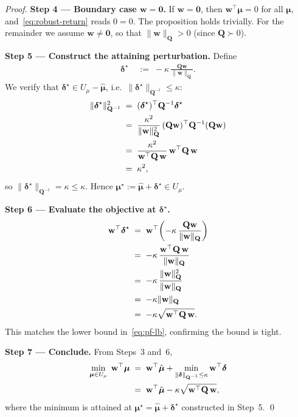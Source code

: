 \documentclass[12pt,openany]{book}
\newcommand{\bfw}{\mathbf{w}}
\newcommand{\bfmu}{\boldsymbol{\mu}}
\newcommand{\bfQ}{\mathbf{Q}}
\newcommand{\bfdelta}{\boldsymbol{\delta}}
\newcommand{\calU}{\mathcal{U}}
\numberwithin{equation}{chapter}
\theoremstyle{plain}
\theoremstyle{definition}
\theoremstyle{remark}
\numberwithin{equation}{chapter}
\theoremstyle{plain}
\def\calU{U}%
\begin{document}
\begin{proof}
\medskip
\noindent\textbf{Step 4 — Boundary case $\bfw = \mathbf{0}$.}
If $\bfw = \mathbf{0}$, then $\bfw^\top\bfmu = 0$ for all $\bfmu$,
and~\eqref{eq:robust-return} reads $0 = 0$.  The proposition holds
trivially.  For the remainder we assume $\bfw \neq \mathbf{0}$,
so that $\|\bfw\|_{\bfQ} > 0$ (since $\bfQ \succ 0$).

\medskip
\noindent\textbf{Step 5 — Construct the attaining perturbation.}
Define
\begin{align}
  \bfdelta^{\star}
  &\;:=\;
  -\kappa\,\frac{\bfQ\bfw}{\|\bfw\|_{\bfQ}}.
  \label{eq:pf-delta-star}
\end{align}
We verify that $\bfdelta^{\star} \in \calU_\mu - \hat{\bfmu}$, i.e.\
$\|\bfdelta^{\star}\|_{\bfQ^{-1}} \leq \kappa$:
\begin{align}
  \|\bfdelta^{\star}\|_{\bfQ^{-1}}^2
  &\;=\;
  (\bfdelta^{\star})^\top \bfQ^{-1} \bfdelta^{\star} \notag\\
  &\;=\;
  \frac{\kappa^2}{\|\bfw\|_{\bfQ}^2}
  \,(\bfQ\bfw)^\top \bfQ^{-1} (\bfQ\bfw) \notag\\
  &\;=\;
  \frac{\kappa^2}{\bfw^\top \bfQ\, \bfw}
  \,\bfw^\top \bfQ\, \bfw \notag\\
  &\;=\; \kappa^2,
  \label{eq:pf-feasible}
\end{align}
so $\|\bfdelta^{\star}\|_{\bfQ^{-1}} = \kappa \leq \kappa$.  Hence
$\bfmu^{\star} := \hat{\bfmu} + \bfdelta^{\star} \in \calU_\mu$.

\medskip
\noindent\textbf{Step 6 — Evaluate the objective at $\bfdelta^{\star}$.}
\begin{align}
  \bfw^\top \bfdelta^{\star}
  &\;=\;
  \bfw^\top\!\left(-\kappa\,\frac{\bfQ\bfw}{\|\bfw\|_{\bfQ}}\right)
  \notag\\
  &\;=\;
  -\kappa\,\frac{\bfw^\top \bfQ\, \bfw}{\|\bfw\|_{\bfQ}} \notag\\
  &\;=\;
  -\kappa\,\frac{\|\bfw\|_{\bfQ}^2}{\|\bfw\|_{\bfQ}} \notag\\
  &\;=\;
  -\kappa\|\bfw\|_{\bfQ} \notag\\
  &\;=\;
  -\kappa\sqrt{\bfw^\top \bfQ\, \bfw}.
  \label{eq:pf-tight}
\end{align}
This matches the lower bound in~\eqref{eq:pf-lb}, confirming the bound
is tight.

\medskip
\noindent\textbf{Step 7 — Conclude.}
From Steps~3 and~6,
\begin{align}
  \min_{\bfmu \in \calU_\mu}\;\bfw^\top\bfmu
  &\;=\;
  \bfw^\top\hat{\bfmu}
  + \min_{\|\bfdelta\|_{\bfQ^{-1}} \leq \kappa}\bfw^\top\bfdelta
  \notag\\
  &\;=\;
  \bfw^\top\hat{\bfmu} - \kappa\sqrt{\bfw^\top \bfQ\, \bfw},
  \label{eq:pf-conclusion}
\end{align}
where the minimum is attained at $\bfmu^{\star} = \hat{\bfmu} +
\bfdelta^{\star}$ constructed in Step~5. \qed
\end{proof}
\end{document}

